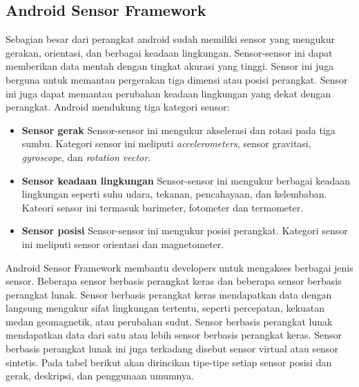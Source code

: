 \subsection{Android Sensor Framework}
\label{sec:android_sensor_framework}
\cite{android_developers}Sebagian besar dari perangkat android sudah memiliki sensor yang mengukur gerakan, orientasi, dan berbagai keadaan lingkungan. Sensor-sensor ini dapat memberikan data mentah dengan tingkat akurasi yang tinggi. Sensor ini juga berguna untuk memantau pergerakan tiga dimensi atau posisi perangkat. Sensor ini juga dapat memantau perubahan keadaan lingkungan yang dekat dengan perangkat. 
Android mendukung tiga kategori sensor:
\begin{itemize}
	\item \textbf{Sensor gerak}
	Sensor-sensor ini mengukur akselerasi dan rotasi pada tiga sumbu. Kategori sensor ini meliputi \textit{accelerometers}, sensor gravitasi, \textit{gyroscope}, dan \textit{rotation vector}. 
	\item \textbf{Sensor keadaan lingkungan}
	Sensor-sensor ini mengukur berbagai keadaan lingkungan seperti suhu udara, tekanan, pencahayaan, dan kelembaban. Kateori sensor ini termasuk barimeter, fotometer dan termometer.
	\item \textbf{Sensor posisi}
	Sensor-sensor ini mengukur posisi perangkat. Kategori sensor ini meliputi sensor orientasi dan magnetometer.
\end{itemize}
Android Sensor Framework membantu developers untuk mengakses berbagai jenis sensor. Beberapa sensor berbasis perangkat keras dan beberapa sensor berbasis perangkat lunak. Sensor berbasis perangkat keras mendapatkan data dengan langsung mengukur sifat lingkungan tertentu, seperti percepatan, kekuatan medan geomagnetik, atau perubahan sudut. Sensor berbasis perangkat lunak mendapatkan data dari satu atau lebih sensor berbasis perangkat keras. Sensor berbasis perangkat lunak ini juga terkadang disebut sensor virtual atau sensor sintetis. Pada tabel berikut akan dirincikan tipe-tipe setiap sensor posisi dan gerak, deskripsi, dan penggunaan umumnya.

